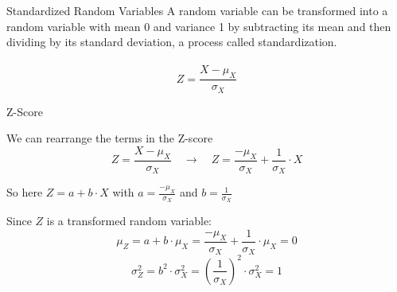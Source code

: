 \documentclass{./../div_teaching_slides}
\begin{document}
\begin{frame}{Standardized Random Variables}
A random variable can be transformed into a random variable with mean 0 and variance 1 by subtracting its mean and then dividing by its standard deviation, a process called standardization. \\~\\
$$ Z = \frac{X-\mu_X}{\sigma_X} $$
\end{frame}


\begin{frame}{Z-Score}
\begin{witemize}
  \item We can rearrange the terms in the Z-score
  $$ Z =  \frac{X-\mu_X}{\sigma_X} \quad \rightarrow \quad Z = \frac{-\mu_X}{\sigma_X} + \frac{1}{\sigma_X} \cdot X $$
  \item So here $ Z = a + b \cdot X $ with 
  $ a = \frac{-\mu_X}{\sigma_X}$ and $b= \frac{1}{\sigma_X} $
  \item Since $Z$ is a transformed random variable:
  $$ \mu_Z = a + b \cdot \mu_X = \frac{-\mu_X}{\sigma_X} + \frac{1}{\sigma_X} \cdot \mu_X = 0   $$
    $$ \sigma^2_Z = b^2 \cdot \sigma_X^2 =  \left(\frac{1}{\sigma_X}\right)^2 \cdot \sigma_X^2  = 1   $$

\end{witemize}

\end{frame}
\end{document}
